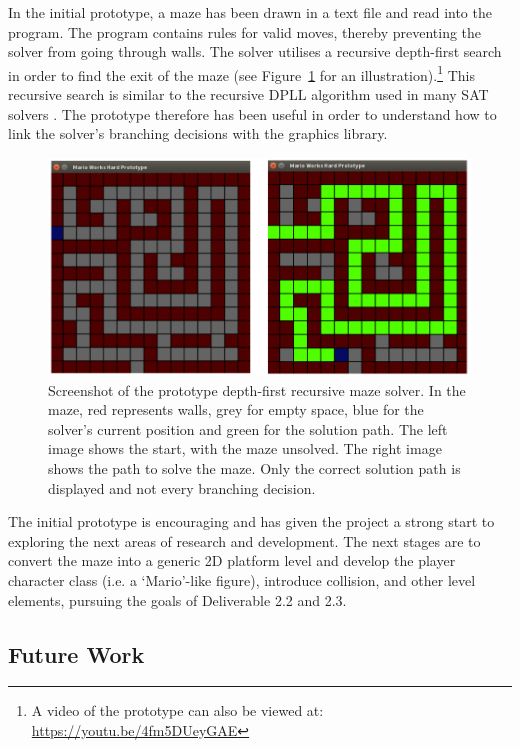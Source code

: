 \documentclass[a4paper]{article}
\begin{document}
In the initial prototype, a maze has been drawn in a text file and read into the program. The
program contains rules for valid moves, thereby preventing the solver from going through walls. The
solver utilises a recursive depth-first search in order to find the exit of the maze (see
Figure~\ref{prototype} for an illustration).\footnote{A video of the prototype can also be viewed
at: \url{ https://youtu.be/4fm5DUeyGAE}} This recursive search is similar to the recursive DPLL
algorithm used in many SAT solvers \cite{zhang2002quest,gomes2008satisfiability}. The prototype
therefore has been useful in order to understand how to link the solver's branching decisions with
the graphics library.

\begin{figure}[h!]

  \centering
    \includegraphics[scale=0.35]{compare}
  \caption{Screenshot of the prototype depth-first recursive maze solver. In the maze, red represents walls, grey for empty space, blue for the solver's current position and green for the solution path. The left image shows the start, with the maze unsolved. The right image shows the path to solve the maze. Only the correct solution path is displayed and not every branching decision.}
  \label{prototype}
\end{figure}

The initial prototype is encouraging and has given the project a strong start to exploring the next
areas of research and development. The next stages are to convert the maze into a generic 2D
platform level and develop the player character class (i.e. a `Mario'-like figure), introduce
collision, and other level elements, pursuing the goals of Deliverable 2.2 and 2.3.

\subsection{Future Work}
\end{document}
